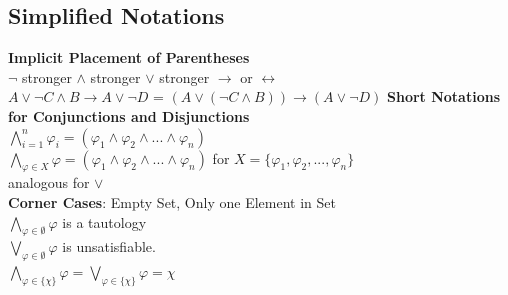 \subsection*{Simplified Notations}
\textbf{Implicit Placement of Parentheses} \\
$\neg$ stronger $\wedge$ stronger $\vee
    $ stronger $\rightarrow$ or $\leftrightarrow$ \\
$A \vee \neg C \wedge B \rightarrow A \vee \neg D$ =  $(A \vee (\neg C \wedge B)) \rightarrow (A \vee \neg D)$
\textbf{Short Notations for Conjunctions and Disjunctions} \\
$\bigwedge_{i=1}^{n} \varphi_i = (\varphi_1 \wedge \varphi_2 \wedge ... \wedge \varphi_n)$ \\
$\bigwedge_{\varphi \in X} \varphi = (\varphi_1 \wedge \varphi_2 \wedge ... \wedge \varphi_n)$ for $X = \{\varphi_1, \varphi_2, ..., \varphi_n\}$ \\
analogous for $\vee$ \\
\textbf{Corner Cases}: Empty Set, Only one Element in Set \\
$\bigwedge_{\varphi \in \emptyset} \varphi$ is a tautology \\
$\bigvee_{\varphi \in \emptyset} \varphi$ is unsatisfiable. \\
$\bigwedge_{\varphi \in \{\chi\}} \varphi = \bigvee_{\varphi \in \{\chi\}} \varphi = \chi$ \\
